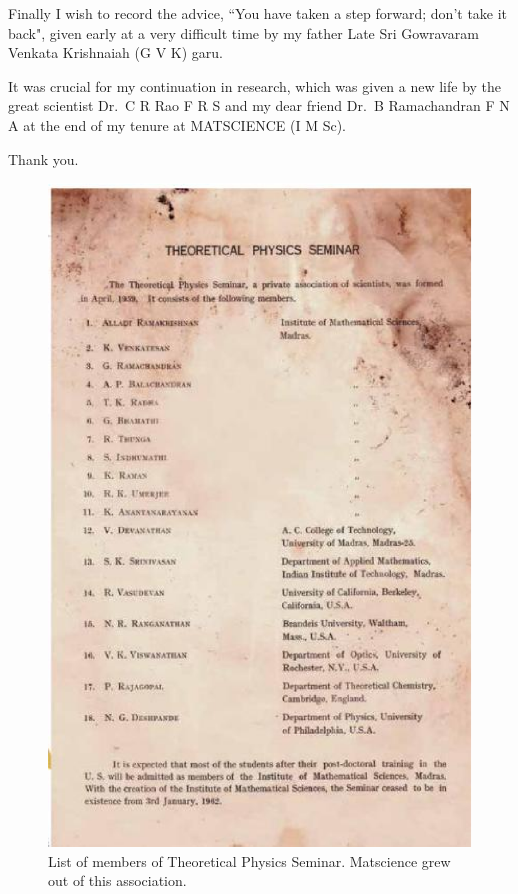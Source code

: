 Finally I wish to record the advice, ``You have taken a step forward; don’t take it
back", given early at a very difficult time by my father Late Sri Gowravaram Venkata
Krishnaiah (G V K) garu.

It was crucial for my continuation in research, which was given a new life by the
great scientist Dr.\ C R Rao F R S and my dear friend Dr.\ B Ramachandran F N A at
the end of my tenure at MATSCIENCE (I M Sc).

\hfill
Thank you.

\begin{figure}[H]
\centering
\includegraphics[scale=0.65]{src/images/chap25/1.eps}
\caption{List of members of Theoretical Physics Seminar. Matscience grew out of
this association.}
\end{figure}

